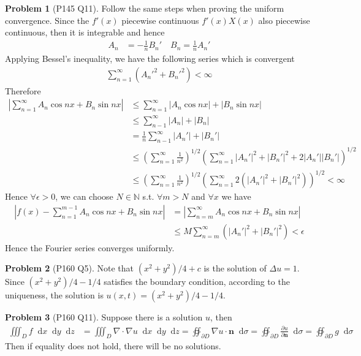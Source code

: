 \documentclass[twoside,11pt]{article}
\newcommand{\N}{\mathbb{N}}
\renewcommand*\d{\mathop{}\!\mathrm{d}}
\theoremstyle{definition}
\newtheorem{problem}{Problem}
\theoremstyle{remark}
\begin{document}
\begin{problem}[P145 Q11]
Follow the same steps when proving the uniform convergence.
Since the $f'(x)$ piecewise continuous $f'(x)X(x)$ also piecewise continuous,
then it is integrable and hence
\begin{align*}
    A_n &= -\frac{1}{n}B_n'\quad B_n = \frac{1}{n}A_n'
\end{align*}
Applying Bessel's inequality, we have the following series which is convergent
\begin{align*}
    \sum_{n=1}^\infty ({A_n'}^2 + {B_n'}^2) < \infty
\end{align*}
Therefore 
\begin{align*}
    \left|\sum_{n=1}^\infty A_n\cos nx + B_n\sin nx\right|
    &\leq \sum_{n=1}^\infty |A_n\cos nx| + |B_n\sin nx|\\
    &\leq \sum_{n-1}^\infty |A_n| + |B_n|\\
    &= \frac{1}{n}\sum_{n-1}^\infty |A_n'| + |B_n'|\\
    &\leq \left(\sum_{n=1}^\infty \frac{1}{n^2}\right)^{1/2}
    \left(\sum_{n=1}^\infty |A_n'|^2 + |B_n'|^2 + 2|A_n'||B_n'|\right)^{1/2}\\
    &\leq \left(\sum_{n=1}^\infty \frac{1}{n^2}\right)^{1/2}
    \left(\sum_{n=1}^\infty 2(|A_n'|^2 + |B_n'|^2)\right)^{1/2}<\infty
\end{align*}
Hence $\forall \epsilon>0$, we can choose $N\in\N$ s.t. $\forall m > N$
and $\forall x$ we have
\begin{align*}
    \left|f(x) - \sum_{n=1}^{m-1} A_n\cos nx + B_n\sin nx\right|
    &= \left|\sum_{n=m}^\infty A_n\cos nx + B_n\sin nx\right|\\
    &\leq M\sum_{n=m}^\infty (|A_n'|^2 + |B_n'|^2) < \epsilon
\end{align*}
Hence the Fourier series converges uniformly.
\end{problem}



\begin{problem}[P160 Q5]
Note that $(x^2+y^2)/4+c$ is the solution of $\Delta u = 1$.
Since $(x^2+y^2)/4 - 1/4$ satisfies the boundary condition, 
according to the uniqueness, the solution is $u(x, t)=(x^2+y^2)/4 - 1/4$.
\end{problem}



\begin{problem}[P160 Q11]
Suppose there is a solution $u$, then
\begin{align*}
    \iiint_D f\d x\d y\d z &= 
    \iiint_D\nabla\cdot\nabla u\d x\d y\d z
    = \oiint_{\partial D}\nabla u\cdot\mathbf{n}\d \sigma
    = \oiint_{\partial D} \frac{\partial u}{\partial \mathbf{n}}\d \sigma
    = \oiint_{\partial D} g\d \sigma
\end{align*}
Then if equality does not hold, there will be no solutions.
\end{problem}
\end{document}
